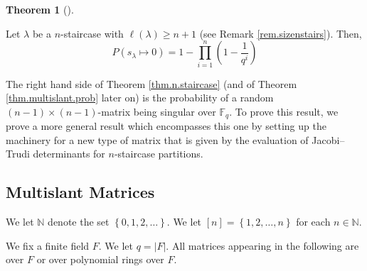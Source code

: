 \documentclass[numbers=enddot,12pt,final,onecolumn,notitlepage]{scrartcl}%
\theoremstyle{definition}
\newtheorem{theo}{Theorem}[section]
\newenvironment{theorem}[1][]
{\begin{theo}[#1]\begin{leftbar}}
{\end{leftbar}\end{theo}}
\newtheorem{remk}[theo]{Remark}
\newenvironment{remark}[1][]
{\begin{remk}[#1]\begin{leftbar}}
{\end{leftbar}\end{remk}}
\let\prodnonlimits\prod
\renewcommand{\prod}{\prodnonlimits\limits}
\newenvironment{noncompile}{}{}
\newcommand{\tup}[1]{\left( #1 \right)}
\renewcommand{\geq}{\geqslant}
\theoremstyle{plainsl}
\begin{document}
\begin{theorem}
\label{thm.n.staircase}
Let $\lambda$ be a $n$-staircase with $\ell(\lambda) \geq n+1 $ (see Remark \ref{rem.sizenstairs}). Then,
\[
P(s_{\lambda} \longmapsto 0) =1- \prod_{i=1}^{n} \left(  1-\dfrac{1}{q^{i}}\right)
\]

\end{theorem}


The right hand side of Theorem \ref{thm.n.staircase} (and of Theorem \ref{thm.multislant.prob} later on) is the probability of a random $\tup{n-1}\times\tup{n-1}$-matrix being singular over $\mathbb{F}_q$. To prove this result, we prove a more general result which encompasses this one by setting up the machinery for a new type of matrix that is given by the evaluation of Jacobi--Trudi determinants for $n$-staircase partitions.


\subsection{Multislant Matrices}
We let $\mathbb{N}$ denote the set $\left\{  0,1,2,\ldots\right\}  $. We let
$\left[  n\right]  =\left\{  1,2,\ldots,n\right\}  $ for each $n\in\mathbb{N}$.

We fix a finite field $F$. We let $q=\left\vert F\right\vert $. All matrices
appearing in the following are over $F$ or over polynomial rings over $F$.

\end{document}
